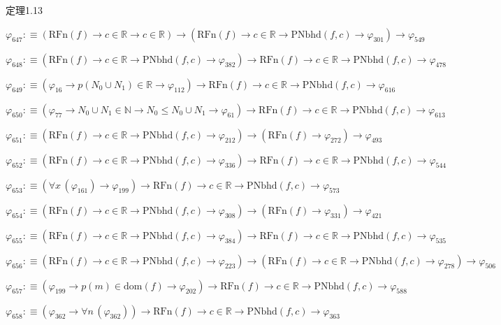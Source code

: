 \begin{fullproof}{定理1.13}
\begin{abbrevlist}
\item $\varphi_{647} :\equiv (\mathrm{RFn}(f) \to c \in \mathbb{R} \to c \in \mathbb{R}) \to (\mathrm{RFn}(f) \to c \in \mathbb{R} \to \mathrm{PNbhd}(f,c) \to \varphi_{301}) \to \varphi_{549}$
\item $\varphi_{648} :\equiv (\mathrm{RFn}(f) \to c \in \mathbb{R} \to \mathrm{PNbhd}(f,c) \to \varphi_{382}) \to \mathrm{RFn}(f) \to c \in \mathbb{R} \to \mathrm{PNbhd}(f,c) \to \varphi_{478}$
\item $\varphi_{649} :\equiv (\varphi_{16} \to p(N_{0} \cup N_{1}) \in \mathbb{R} \to \varphi_{112}) \to \mathrm{RFn}(f) \to c \in \mathbb{R} \to \mathrm{PNbhd}(f,c) \to \varphi_{616}$
\item $\varphi_{650} :\equiv (\varphi_{77} \to N_{0} \cup N_{1} \in \mathbb{N} \to N_{0} \leq N_{0} \cup N_{1} \to \varphi_{61}) \to \mathrm{RFn}(f) \to c \in \mathbb{R} \to \mathrm{PNbhd}(f,c) \to \varphi_{613}$
\item $\varphi_{651} :\equiv (\mathrm{RFn}(f) \to c \in \mathbb{R} \to \mathrm{PNbhd}(f,c) \to \varphi_{212}) \to (\mathrm{RFn}(f) \to \varphi_{272}) \to \varphi_{493}$
\item $\varphi_{652} :\equiv (\mathrm{RFn}(f) \to c \in \mathbb{R} \to \mathrm{PNbhd}(f,c) \to \varphi_{336}) \to \mathrm{RFn}(f) \to c \in \mathbb{R} \to \mathrm{PNbhd}(f,c) \to \varphi_{544}$
\item $\varphi_{653} :\equiv (\forall x\,(\varphi_{161}) \to \varphi_{199}) \to \mathrm{RFn}(f) \to c \in \mathbb{R} \to \mathrm{PNbhd}(f,c) \to \varphi_{573}$
\item $\varphi_{654} :\equiv (\mathrm{RFn}(f) \to c \in \mathbb{R} \to \mathrm{PNbhd}(f,c) \to \varphi_{308}) \to (\mathrm{RFn}(f) \to \varphi_{331}) \to \varphi_{421}$
\item $\varphi_{655} :\equiv (\mathrm{RFn}(f) \to c \in \mathbb{R} \to \mathrm{PNbhd}(f,c) \to \varphi_{384}) \to \mathrm{RFn}(f) \to c \in \mathbb{R} \to \mathrm{PNbhd}(f,c) \to \varphi_{535}$
\item $\varphi_{656} :\equiv (\mathrm{RFn}(f) \to c \in \mathbb{R} \to \mathrm{PNbhd}(f,c) \to \varphi_{223}) \to (\mathrm{RFn}(f) \to c \in \mathbb{R} \to \mathrm{PNbhd}(f,c) \to \varphi_{278}) \to \varphi_{506}$
\item $\varphi_{657} :\equiv (\varphi_{199} \to p(m) \in \mathrm{dom}(f) \to \varphi_{202}) \to \mathrm{RFn}(f) \to c \in \mathbb{R} \to \mathrm{PNbhd}(f,c) \to \varphi_{588}$
\item $\varphi_{658} :\equiv (\varphi_{362} \to \forall n\,(\varphi_{362})) \to \mathrm{RFn}(f) \to c \in \mathbb{R} \to \mathrm{PNbhd}(f,c) \to \varphi_{363}$

\end{abbrevlist}
\end{fullproof}
